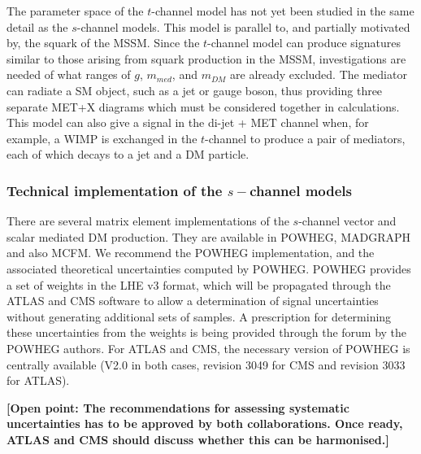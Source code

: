 \documentclass[debug,notitlepage]{dmfm}
\newcommand{\mdm}{\ensuremath{m_{DM}}\xspace}
\newcommand{\mmed}{\ensuremath{m_{med}}\xspace}
\newif\ifATLAS
\begin{document}
The parameter space of the $t$-channel model 
has not yet been studied in the same detail as the
$s$-channel models. 
This model is parallel to, and partially motivated by, the
squark of the MSSM. Since the $t$-channel model can produce signatures 
similar to those arising from squark production in the MSSM, investigations 
are needed of what ranges of $g$, \mmed, and \mdm are already excluded.
The mediator can radiate a SM object, such as a jet or gauge boson, 
thus providing three separate MET+X diagrams which must be considered together in
calculations. This model can also give a signal in the di-jet + MET
channel when, for example, a WIMP is exchanged in the $t$-channel to
produce a pair of mediators, each of which decays to a jet and a DM particle.

\subsubsection{Technical implementation of the $s-$channel models} 

There are several matrix element implementations of the $s$-channel
vector and scalar mediated DM production.
They are available in POWHEG, MADGRAPH
and also MCFM. We recommend the POWHEG implementation, 
and the associated theoretical uncertainties 
computed by POWHEG. 
POWHEG provides a set
of weights in the LHE v3 format, which will be propagated through the
ATLAS and CMS software to allow a determination of signal uncertainties
without generating additional sets of samples. A prescription for
determining these uncertainties from the weights is being provided
through the forum by the POWHEG authors.
For ATLAS and CMS, the necessary version of POWHEG is centrally available 
(V2.0 in both cases, revision 3049 for CMS and revision 3033 for ATLAS).

\textbf{[Open point: The recommendations for assessing systematic uncertainties has to be approved by 
both collaborations. Once ready, ATLAS and CMS should discuss whether this can be harmonised.]}

\ifATLAS 
The $s-$channel vector mediator model is included in this pilot 
MC15 request~\cite{ATLAS_PowhegPythiaMC15Test}, and instructions will be provided on a dedicated
twiki page. 
\fi
\end{document}
